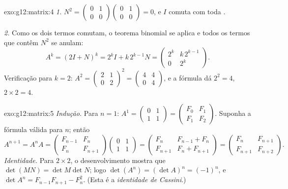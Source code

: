 \begin{solution}{exo:g12:matrix:4}
\emph{1.} $N^2 = \begin{pmatrix} 0&1\\0&0\end{pmatrix}
\begin{pmatrix} 0&1\\0&0\end{pmatrix} = 0$, e $I$ comuta com toda
.

\emph{2.} Como os dois termos comutam, o teorema binomial se aplica e
todos os termos que contêm $N^2$ se anulam:
\[
A^k = (2I + N)^k = 2^k I + k\,2^{k-1} N
= \begin{pmatrix} 2^k & k\,2^{k-1}\\ 0 & 2^k \end{pmatrix}.
\]
Verificação para $k = 2$:
$A^2 = \begin{pmatrix} 2&1\\0&2\end{pmatrix}^2
= \begin{pmatrix} 4&4\\0&4\end{pmatrix}$, e a fórmula dá
$2^2 = 4$, $2 \times 2 = 4$. \checkmark
\end{solution}

\begin{solution}{exo:g12:matrix:5}
\emph{Indução.} Para $n = 1$:
$A^1 = \begin{pmatrix} 0&1\\1&1\end{pmatrix}
= \begin{pmatrix} F_0 & F_1\\ F_1 & F_2\end{pmatrix}$. Suponha a fórmula
válida para $n$; então
\[
A^{n+1} = A^n A
= \begin{pmatrix} F_{n-1} & F_n\\ F_n & F_{n+1}\end{pmatrix}
\begin{pmatrix} 0 & 1\\ 1 & 1\end{pmatrix}
= \begin{pmatrix} F_n & F_{n-1} + F_n\\ F_{n+1} & F_n + F_{n+1}\end{pmatrix}
= \begin{pmatrix} F_n & F_{n+1}\\ F_{n+1} & F_{n+2}\end{pmatrix}.
\]
\emph{Identidade.} Para  $2\times2$, o desenvolvimento mostra que
$\det(MN) = \det M \det N$; logo
$\det(A^n) = (\det A)^n = (-1)^n$, e
$\det A^n = F_{n-1}F_{n+1} - F_n^2$. (Esta é a \emph{identidade de
Cassini}.)
\end{solution}

